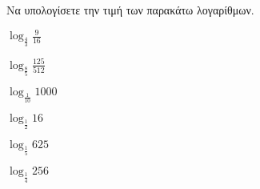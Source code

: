 Να υπολογίσετε την τιμή των παρακάτω λογαρίθμων.
\begin{multicols}{3}
\begin{rlist}[leftmargin=2mm]
\item $ \log_{\frac{4}{3}}{\frac{9}{16}} $
\item $ \log_{\frac{8}{5}}{\frac{125}{512}} $
\item $ \log_{\frac{1}{10}}{1000} $
\item $ \log_{\frac{1}{2}}{16} $
\item $ \log_{\frac{1}{5}}{625} $
\item $ \log_{\frac{1}{4}}{256} $
\end{rlist}
\end{multicols}
